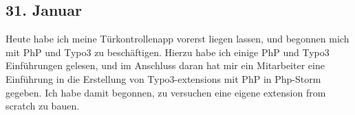 \subsection{31. Januar}
Heute habe ich meine Türkontrollenapp vorerst liegen lassen, und begonnen mich mit PhP und Typo3 zu beschäftigen. Hierzu habe ich einige PhP und Typo3 Einführungen gelesen, und im Anschluss daran hat mir ein Mitarbeiter eine Einführung in die Erstellung von Typo3-extensions mit PhP in Php-Storm gegeben. Ich habe damit begonnen, zu versuchen eine eigene extension from scratch zu bauen.
